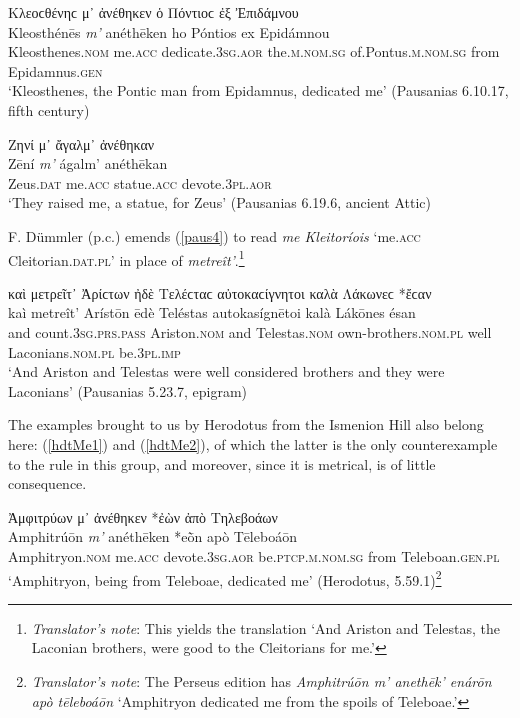 \begin{exe}
\ex Κλεοϲθένηϲ μ᾽ ἀνέθηκεν ὁ Πόντιοϲ ἐξ Ἐπιδάμνου\\
\gll Kleosthénēs \emph{m'} anéthēken ho Póntios ex Epidámnou\\
Kleosthenes.\textsc{nom} me.\textsc{acc} dedicate.\textsc{3sg.aor} the.\textsc{m.nom.sg} of.Pontus.\textsc{m.nom.sg} from Epidamnus.\textsc{gen}\\
\trans `Kleosthenes, the Pontic man from Epidamnus, dedicated me' (Pausanias 6.10.17, fifth century)
\label{paus2}
\end{exe}

\begin{exe}
\ex Ζηνί μ᾽ ἄγαλμ᾽ ἀνέθηκαν\\
\gll Zēní \emph{m'} ágalm' anéthēkan\\
Zeus.\textsc{dat} me.\textsc{acc} statue.\textsc{acc} devote.\textsc{3pl.aor}\\
\trans `They raised me, a statue, for Zeus' (Pausanias 6.19.6, ancient Attic)
\label{paus3}
\end{exe}

F. Dümmler (p.c.) emends (\ref{paus4}) to read \textit{\emph{me} Kleitoríois} `me.\textsc{acc} Cleitorian.\textsc{dat.pl}' in place of \textit{metreît'}.\footnote{\emph{Translator's note}: This yields the translation `And Ariston and Telestas, the Laconian brothers, were good to the Cleitorians for me.'}

\begin{exe}
\ex καὶ μετρεῖτ᾽ Ἀρίϲτων ἠδὲ Τελέϲταϲ αὐτοκαϲίγνητοι καλὰ Λάκωνεϲ *ἔϲαν\\
\gll kaì metreît' Arístōn ēdè Teléstas autokasígnētoi kalà Lákōnes ésan\\
and count.\textsc{3sg.prs.pass} Ariston.\textsc{nom} and Telestas.\textsc{nom} own-brothers.\textsc{nom.pl} well Laconians.\textsc{nom.pl} be.\textsc{3pl.imp}\\
\trans `And Ariston and Telestas were well considered brothers and they were Laconians' (Pausanias 5.23.7, epigram)
\label{paus4}
\end{exe}

The examples brought to us by Herodotus from the Ismenion Hill also belong here: (\ref{hdtMe1}) and (\ref{hdtMe2}), of which the latter is the only counterexample to the rule in this group, and moreover, since it is metrical, is of little consequence.

\begin{exe}
\ex Ἀμφιτρύων μ᾽ ἀνέθηκεν *ἐὼν ἀπὸ Τηλεβοάων\\
\gll Amphitrúōn \emph{m'} anéthēken *eṑn apò Tēleboáōn\\
Amphitryon.\textsc{nom} me.\textsc{acc} devote.\textsc{3sg.aor} be.\textsc{ptcp.m.nom.sg} from Teleboan.\textsc{gen.pl}\\
\trans `Amphitryon, being from Teleboae, dedicated me' (Herodotus, 5.59.1)\footnote{\emph{Translator's note}: The Perseus edition has \emph{Amphitrúōn m' anethēk' enárōn apò tēleboáōn} `Amphitryon dedicated me from the spoils of Teleboae.'}
\label{hdtMe1}
\end{exe}

